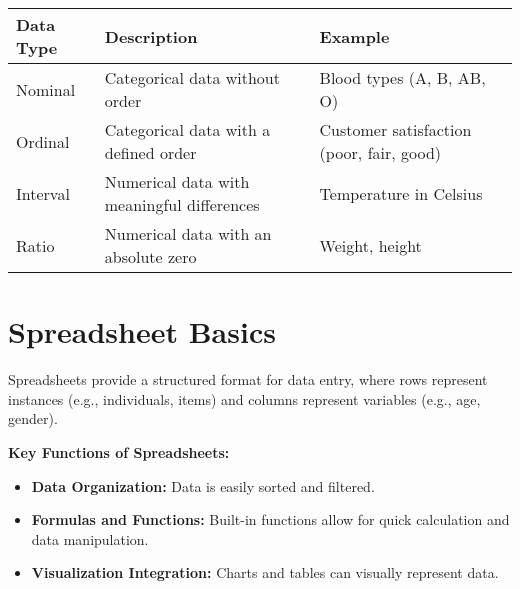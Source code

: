 \documentclass[
  letterpaper,
  DIV=11,
  numbers=noendperiod]{scrreprt}
\providecommand{\tightlist}{%
  \setlength{\itemsep}{0pt}\setlength{\parskip}{0pt}}
\begin{document}
\begin{longtable}[]{@{}
  >{\raggedright\arraybackslash}p{}
  >{\raggedright\arraybackslash}p{}
  >{\raggedright\arraybackslash}p{}@{}}
\toprule\noalign{}
\begin{minipage}[b]{\linewidth}\raggedright
Data Type
\end{minipage} & \begin{minipage}[b]{\linewidth}\raggedright
Description
\end{minipage} & \begin{minipage}[b]{\linewidth}\raggedright
Example
\end{minipage} \\
\midrule\noalign{}
\endhead
\bottomrule\noalign{}
\endlastfoot
Nominal & Categorical data without order & Blood types (A, B, AB, O) \\
Ordinal & Categorical data with a defined order & Customer satisfaction
(poor, fair, good) \\
Interval & Numerical data with meaningful differences & Temperature in
Celsius \\
Ratio & Numerical data with an absolute zero & Weight, height \\
\end{longtable}

\section{Spreadsheet Basics}\label{spreadsheet-basics}

Spreadsheets provide a structured format for data entry, where rows
represent instances (e.g., individuals, items) and columns represent
variables (e.g., age, gender).

\textbf{Key Functions of Spreadsheets:}

\begin{itemize}
\tightlist
\item
  \textbf{Data Organization:} Data is easily sorted and filtered.
\item
  \textbf{Formulas and Functions:} Built-in functions allow for quick
  calculation and data manipulation.
\item
  \textbf{Visualization Integration:} Charts and tables can visually
  represent data.
\end{itemize}

\end{document}
